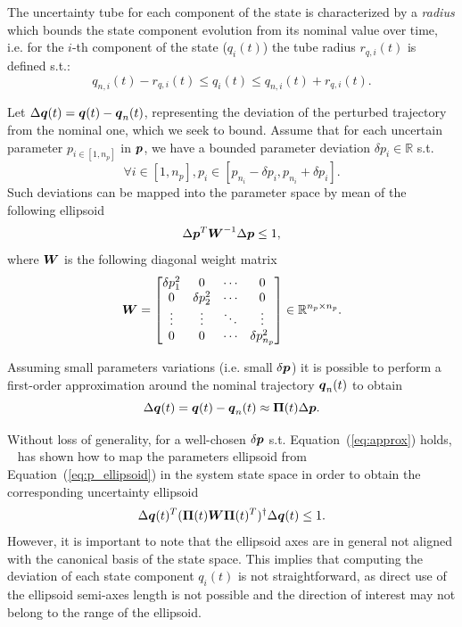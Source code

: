 The uncertainty tube for each component of the state is characterized by a \emph{radius} which bounds the state component evolution from its nominal value over time, i.e. for the $i$-th component of the state ($q_i(t)$) the tube radius $r_{q,i}(t)$ is defined s.t.:
\begin{equation}\label{eq:bounds_q}
  q_{n,i}(t) - r_{q,i}(t) \leq q_i(t) \leq q_{n,i}(t) + r_{q,i}(t).
\end{equation}

Let $\Delta\boldsymbol{q}(t) = \boldsymbol{q}(t) - \boldsymbol{q}_n(t)$, representing the deviation of the perturbed trajectory from the nominal one, which we seek to bound.
Assume that for each uncertain parameter $p_{i \in [1, n_p]}$ in $\boldsymbol{p}$, we have a bounded parameter deviation $\delta p_i \in \mathbb{R}$ s.t. 
\begin{equation*}
  \forall i \in [1, n_p] ,p_i \in [p_{n_i}-\delta p_i, p_{n_i}+\delta p_i].
\end{equation*}
Such deviations can be mapped into the parameter space by mean of the following ellipsoid
\begin{equation}\label{eq:p_ellipsoid}
  \Delta\boldsymbol{p}^T \boldsymbol{W}^{-1} \Delta\boldsymbol{p} \leq 1,
\end{equation}
where $\boldsymbol{W}$ is the following diagonal weight matrix
\begin{equation*}
  \boldsymbol{W} = \begin{bmatrix}
    \delta p_1^2 & 0 & \cdots & 0 \\
    0 & \delta p_2^2 & \cdots & 0 \\
    \vdots & \vdots & \ddots & \vdots \\
    0 & 0 & \cdots & \delta p_{n_p}^2
    \end{bmatrix} \in \mathbb{R}^{n_p \times n_p}.
\end{equation*}

Assuming small parameters variations (i.e. small $\delta \boldsymbol{p}$) it is possible to perform a first-order approximation around the nominal trajectory $\boldsymbol{q}_n(t)$ to obtain 
\begin{equation}\label{eq:approx}
  \Delta\boldsymbol{q}(t) =  \boldsymbol{q}(t) - \boldsymbol{q}_n(t) \approx \boldsymbol{\Pi}(t) \Delta\boldsymbol{p}.
\end{equation}

Without loss of generality, for a well-chosen $\delta \boldsymbol{p}$ s.t. Equation~(\ref{eq:approx}) holds, ~\cite{cTube} has shown how to map the parameters ellipsoid from Equation~(\ref{eq:p_ellipsoid}) in the system state space in order to obtain the corresponding uncertainty ellipsoid
\begin{equation}\label{eq:q_ellipsoid}
  \Delta\boldsymbol{q}(t)^T (\boldsymbol{\Pi}(t) \boldsymbol{W} \boldsymbol{\Pi}(t)^T)^\dag \Delta\boldsymbol{q}(t) \leq 1.
\end{equation}
However, it is important to note that the ellipsoid axes are in general not aligned with the canonical basis of the state space.
This implies that computing the deviation of each state component $q_i(t)$ is not straightforward, as direct use of the ellipsoid semi-axes length is not possible and the direction of interest may not belong to the range of the ellipsoid.


